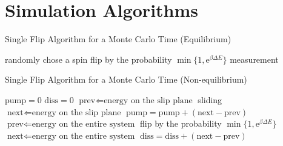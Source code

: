 
\chapter{Simulation Algorithms}

\begin{algorithm}                      
	\caption{Single Flip Algorithm for a Monte Carlo Time (Equilibrium)}         
	\label{alg:SFAEMC}                          
	\begin{algorithmic}                  
	\STATE randomly chose a spin
	\STATE flip by the probability $\min\{1, \mathrm{e}^{\beta \Delta E}\}$
	\ENDFOR
	\STATE measurement
	\end{algorithmic}
\end{algorithm}

\begin{algorithm}                      
	\caption{Single Flip Algorithm for a Monte Carlo Time (Non-equilibrium)}         
	\label{alg:SFANEMC}                          
	\begin{algorithmic} 
		\STATE $\text{pump} = 0$  
		\STATE $\text{diss} = 0$                     
			\STATE $\text{prev}\Leftarrow \text{energy on the slip plane}$
			\STATE sliding
			\STATE $\text{next}\Leftarrow \text{energy on the slip plane}$
			\STATE $\text{pump} = \text{pump} + (\text{next} - \text{prev})$
			\\
			\STATE $\text{prev}\Leftarrow \text{energy on the entire system}$
				\STATE flip by the probability $\min\{1, \mathrm{e}^{\beta \Delta E}\}$
			\ENDFOR
			\STATE $\text{next}\Leftarrow \text{energy on the entire system}$
			\STATE $\text{diss} = \text{diss} + (\text{next} - \text{prev})$
		\ENDFOR
	\end{algorithmic}
\end{algorithm}